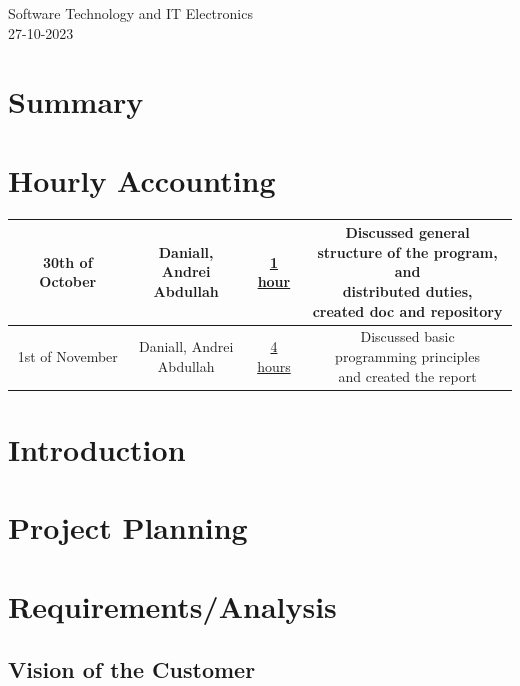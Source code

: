 \documentclass{article}
\begin{document}
\begin{center}
    \Large{Software Technology and IT Electronics} \\
    \Large{27-10-2023}
\end{center}

\pagebreak

\section{Summary}
\section{Hourly Accounting}
\begin{center}
    \begin{tabular}{| c | c | c | c |}
      \hline
      30th of October & \makecell{Daniall, Andrei \\ Abdullah} & \underline{1 hour} & \makecell{Discussed general \\ structure of the program, and \\ distributed duties, \\ created doc and repository} \\
      \hline
      1st of November & \makecell{Daniall, Andrei \\ Abdullah} & \underline{4 hours} & \makecell{Discussed basic \\ programming principles \\ and created the report} \\
      \hline
    \end{tabular}
\end{center}

\pagebreak

\tableofcontents

\pagebreak

\section{Introduction}
\section{Project Planning}
\section{Requirements/Analysis}
\subsection{Vision of the Customer}
\end{document}

